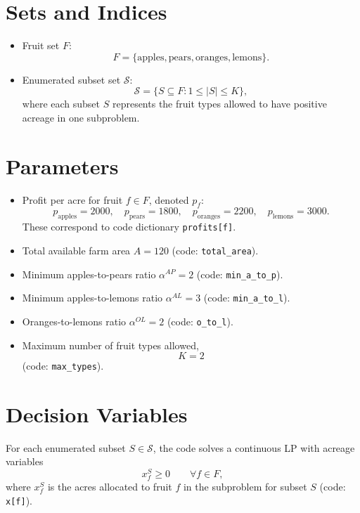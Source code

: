 \section*{Sets and Indices}

\begin{itemize}
    \item Fruit set $F$:
    \[
    F=\{\text{apples},\text{pears},\text{oranges},\text{lemons}\}.
    \]
    \item Enumerated subset set $\mathcal{S}$:
    \[
    \mathcal{S}=\{S \subseteq F : 1 \le |S| \le K\},
    \]
    where each subset $S$ represents the fruit types allowed to have positive acreage in one subproblem.
\end{itemize}

\section*{Parameters}

\begin{itemize}
    \item Profit per acre for fruit $f \in F$, denoted $p_f$:
    \[
    p_{\text{apples}}=2000,\quad
    p_{\text{pears}}=1800,\quad
    p_{\text{oranges}}=2200,\quad
    p_{\text{lemons}}=3000.
    \]
    These correspond to code dictionary \texttt{profits[f]}.

    \item Total available farm area $A=120$ (code: \texttt{total\_area}).

    \item Minimum apples-to-pears ratio $\alpha^{AP}=2$ (code: \texttt{min\_a\_to\_p}).

    \item Minimum apples-to-lemons ratio $\alpha^{AL}=3$ (code: \texttt{min\_a\_to\_l}).

    \item Oranges-to-lemons ratio $\alpha^{OL}=2$ (code: \texttt{o\_to\_l}).

    \item Maximum number of fruit types allowed,
    \[
    K=2
    \]
    (code: \texttt{max\_types}).
\end{itemize}

\section*{Decision Variables}

For each enumerated subset $S \in \mathcal{S}$, the code solves a continuous LP with acreage variables
\[
x_f^{S} \ge 0 \qquad \forall f \in F,
\]
where $x_f^{S}$ is the acres allocated to fruit $f$ in the subproblem for subset $S$ (code: \texttt{x[f]}).

